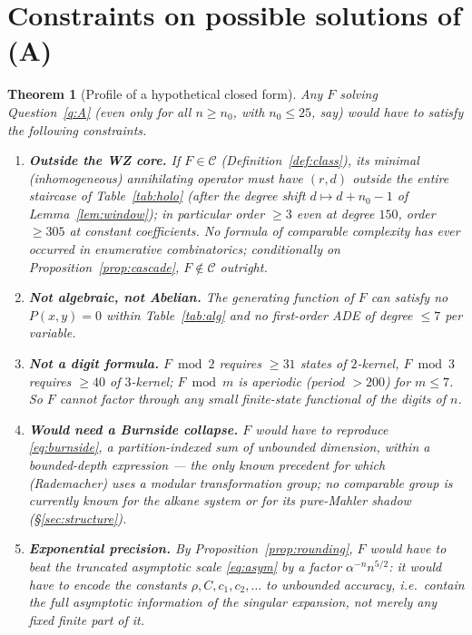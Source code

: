 \documentclass[11pt]{article}
\newtheorem{theorem}{Theorem}[section]
\theoremstyle{definition}
\begin{document}
\section{Constraints on possible solutions of (A)}\label{sec:necessary}

\begin{theorem}[Profile of a hypothetical closed form]\label{thm:profile}
Any $F$ solving Question~\ref{q:A} (even only for all $n\ge n_0$, with
$n_0\le 25$, say) would have to satisfy the following constraints.
\begin{enumerate}
\item \textbf{Outside the WZ core.} If $F\in\mathcal{C}$
(Definition~\ref{def:class}), its minimal (inhomogeneous) annihilating operator
must have $(r,d)$ \emph{outside} the entire staircase of Table~\ref{tab:holo}
(after the degree shift $d\mapsto d+n_0-1$ of Lemma~\ref{lem:window}); in
particular order $\ge3$ even at degree $150$, order $\ge305$ at constant
coefficients. No formula of comparable complexity has ever occurred in
enumerative combinatorics; conditionally on Proposition~\ref{prop:cascade},
$F\notin\mathcal{C}$ outright.
\item \textbf{Not algebraic, not Abelian.} The generating function of $F$ can
satisfy no $P(x,y)=0$ within Table~\ref{tab:alg} and no first-order ADE of
degree $\le7$ per variable.
\item \textbf{Not a digit formula.} $F \bmod 2$ requires $\ge31$ states of
$2$-kernel, $F\bmod3$ requires $\ge40$ of $3$-kernel; $F\bmod m$ is aperiodic
(period $>200$) for $m\le7$. So $F$ cannot factor through any small
finite-state functional of the digits of $n$.
\item \textbf{Would need a Burnside collapse.} $F$ would have to reproduce
\eqref{eq:burnside}, a partition-indexed sum of unbounded dimension, within a
bounded-depth expression --- the only known precedent for which (Rademacher)
uses a modular transformation group; no comparable group is currently known for
the alkane system or for its pure-Mahler shadow
(\S\ref{sec:structure}).
\item \textbf{Exponential precision.} By Proposition~\ref{prop:rounding}, $F$
would have to beat the truncated asymptotic scale \eqref{eq:asym} by a factor
$\alpha^{-n}n^{5/2}$: it would have to encode the constants
$\rho, C, c_1, c_2,\dots$ to unbounded accuracy, i.e.\ contain the full
asymptotic information of the singular expansion, not merely any fixed finite
part of it.
\end{enumerate}
\end{theorem}
\end{document}
